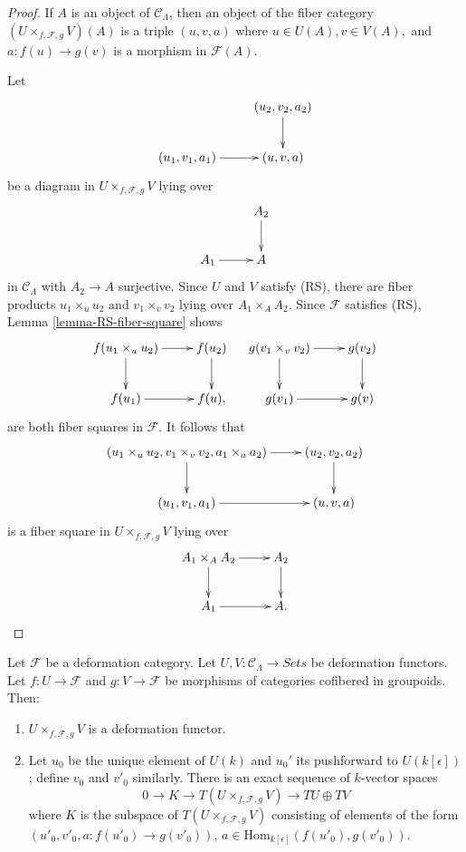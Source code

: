 \begin{proof}
If $A$ is an object of $\mathcal{C}_\Lambda$, then an object of the fiber 
category $(U \times_{f, \mathcal{F}, g} V)(A)$ is a triple $(u,v,a)$ where $u 
\in U(A), v \in V(A),$ and $a: f(u) \to g(v)$ is a morphism in 
$\mathcal{F}(A)$.  

\medskip \noindent 
Let
\[
\xymatrix{
           & (u_2,v_2,a_2) \ar[d] \\
(u_1,v_1,a_1) \ar[r] & (u,v,a)  
}
\]
be a diagram in $U \times_{f, \mathcal{F}, g} V$ lying over
\[
\xymatrix{
           & A_2 \ar[d] \\
A_1 \ar[r] & A   
}
\]  
in $\mathcal{C}_\Lambda$ with $A_2 \to A$ surjective.  Since $U$ and 
$V$ satisfy (RS), there are fiber products $u_1 \times_{u} u_2$ and $v_1 
\times_{v} v_2$ lying over $A_1 \times_{A} A_2$.  Since $\mathcal{F}$ satisfies 
(RS), Lemma \ref{lemma-RS-fiber-square} shows
\[
\xymatrix{
 f(u_1 \times_{u} u_2) \ar[r] \ar[d] & f(u_2) \ar[d] \\
f(u_1) \ar[r] & f(u), 
} \hspace{4 mm} 
\xymatrix{
 g(v_1 \times_{v} v_2) \ar[r] \ar[d] & g(v_2) \ar[d] \\ 
 g(v_1) \ar[r] & g(v)
}
\]
are both fiber squares in $\mathcal{F}$.  It follows that
\[
\xymatrix{
 (u_1 \times_{u} u_2, v_1 \times_{v} v_2, a_{1} \times_{a} a_2) \ar[d] \ar[r] & 
(u_2,v_2,a_2) \ar[d] \\
(u_1,v_1,a_1) \ar[r] & (u,v,a)  
}
\]
is a fiber square in $U \times_{f, \mathcal{F}, g} V$ lying over
\[
\xymatrix{
A_1 \times_{A} A_2  \ar[r] \ar[d]         & A_2 \ar[d] \\
A_1 \ar[r] & A   .
}
\] 
\end{proof}

\begin{lemma}
\label{lemma-deformation-functor-fiber-product-morphisms}
Let $\mathcal{F}$ be a deformation category.  Let $U,V: \mathcal{C}_\Lambda 
\to \textit{Sets}$ be deformation functors.  Let $f: U 
\to \mathcal{F}$ and $g: V \to \mathcal{F}$ be morphisms of 
categories cofibered in groupoids. Then: 
\begin{enumerate}
\item $U \times_{f, \mathcal{F}, g} V$ is a deformation functor.
\item Let $u_0$ be the unique element of $U(k)$ and $u_0'$ its pushforward to 
$U(k[\epsilon])$; define $v_0$ and $v'_0$ similarly.  There is an exact 
sequence of $k$-vector spaces
\[ 
0 \to K \to T(U \times_{f, \mathcal{F}, g} V) \to TU 
\oplus TV 
\]
where $K$ is the subspace of $T(U \times_{f, \mathcal{F}, g} V)$ consisting of 
elements of the form $(u'_0, v'_0, a: f(u'_0) \to g(v'_0))$, $a \in 
\text{Hom}_{k[\epsilon]}(f(u'_0), g(v'_0))$.
\end{enumerate}
\end{lemma}

